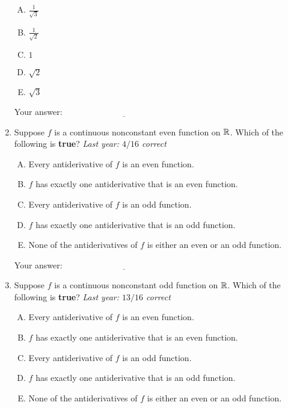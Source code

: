 \documentclass[10pt]{amsart}
\begin{document}
\begin{enumerate}
  \begin{enumerate}[(A)]
  \item $\frac{1}{\sqrt{3}}$
  \item $\frac{1}{\sqrt{2}}$
  \item $1$
  \item $\sqrt{2}$
  \item $\sqrt{3}$
  \end{enumerate}

  \vspace{0.1in}
  Your answer: $\underline{\qquad\qquad\qquad\qquad\qquad\qquad\qquad}$
  \vspace{0.6in}

\item Suppose $f$ is a continuous nonconstant even function on
  $\mathbb{R}$. Which of the following is {\bf true}? {\em Last year: $4/16$
  correct}
  
  \begin{enumerate}[(A)]
  \item Every antiderivative of $f$ is an even function.
  \item $f$ has exactly one antiderivative that is an even function.
  \item Every antiderivative of $f$ is an odd function.
  \item $f$ has exactly one antiderivative that is an odd function.
  \item None of the antiderivatives of $f$ is either an even or an odd
    function.
  \end{enumerate}

  \vspace{0.1in}
  Your answer: $\underline{\qquad\qquad\qquad\qquad\qquad\qquad\qquad}$
  \vspace{0.6in}

\item Suppose $f$ is a continuous nonconstant odd function on
  $\mathbb{R}$. Which of the following is {\bf true}? {\em Last year: $13/16$
  correct}

  \begin{enumerate}[(A)]
  \item Every antiderivative of $f$ is an even function.
  \item $f$ has exactly one antiderivative that is an even function.
  \item Every antiderivative of $f$ is an odd function.
  \item $f$ has exactly one antiderivative that is an odd function.
  \item None of the antiderivatives of $f$ is either an even or an odd
    function.
  \end{enumerate}


\end{enumerate}
\end{document}
